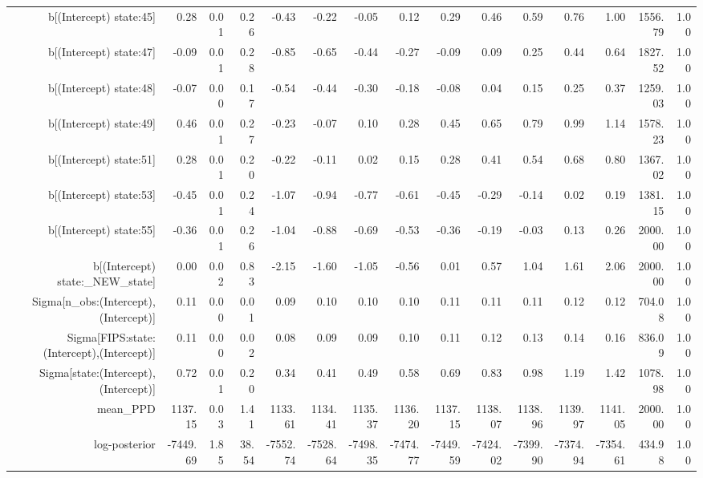 \begin{table}[ht]
\begin{tabular}{rrrrrrrrrrrrrrr}
  b[(Intercept) state:45] & 0.28 & 0.01 & 0.26 & -0.43 & -0.22 & -0.05 & 0.12 & 0.29 & 0.46 & 0.59 & 0.76 & 1.00 & 1556.79 & 1.00 \\ 
  b[(Intercept) state:47] & -0.09 & 0.01 & 0.28 & -0.85 & -0.65 & -0.44 & -0.27 & -0.09 & 0.09 & 0.25 & 0.44 & 0.64 & 1827.52 & 1.00 \\ 
  b[(Intercept) state:48] & -0.07 & 0.00 & 0.17 & -0.54 & -0.44 & -0.30 & -0.18 & -0.08 & 0.04 & 0.15 & 0.25 & 0.37 & 1259.03 & 1.00 \\ 
  b[(Intercept) state:49] & 0.46 & 0.01 & 0.27 & -0.23 & -0.07 & 0.10 & 0.28 & 0.45 & 0.65 & 0.79 & 0.99 & 1.14 & 1578.23 & 1.00 \\ 
  b[(Intercept) state:51] & 0.28 & 0.01 & 0.20 & -0.22 & -0.11 & 0.02 & 0.15 & 0.28 & 0.41 & 0.54 & 0.68 & 0.80 & 1367.02 & 1.00 \\ 
  b[(Intercept) state:53] & -0.45 & 0.01 & 0.24 & -1.07 & -0.94 & -0.77 & -0.61 & -0.45 & -0.29 & -0.14 & 0.02 & 0.19 & 1381.15 & 1.00 \\ 
  b[(Intercept) state:55] & -0.36 & 0.01 & 0.26 & -1.04 & -0.88 & -0.69 & -0.53 & -0.36 & -0.19 & -0.03 & 0.13 & 0.26 & 2000.00 & 1.00 \\ 
  b[(Intercept) state:\_NEW\_state] & 0.00 & 0.02 & 0.83 & -2.15 & -1.60 & -1.05 & -0.56 & 0.01 & 0.57 & 1.04 & 1.61 & 2.06 & 2000.00 & 1.00 \\ 
  Sigma[n\_obs:(Intercept),(Intercept)] & 0.11 & 0.00 & 0.01 & 0.09 & 0.10 & 0.10 & 0.10 & 0.11 & 0.11 & 0.11 & 0.12 & 0.12 & 704.08 & 1.00 \\ 
  Sigma[FIPS:state:(Intercept),(Intercept)] & 0.11 & 0.00 & 0.02 & 0.08 & 0.09 & 0.09 & 0.10 & 0.11 & 0.12 & 0.13 & 0.14 & 0.16 & 836.09 & 1.00 \\ 
  Sigma[state:(Intercept),(Intercept)] & 0.72 & 0.01 & 0.20 & 0.34 & 0.41 & 0.49 & 0.58 & 0.69 & 0.83 & 0.98 & 1.19 & 1.42 & 1078.98 & 1.00 \\ 
  mean\_PPD & 1137.15 & 0.03 & 1.41 & 1133.61 & 1134.41 & 1135.37 & 1136.20 & 1137.15 & 1138.07 & 1138.96 & 1139.97 & 1141.05 & 2000.00 & 1.00 \\ 
  log-posterior & -7449.69 & 1.85 & 38.54 & -7552.74 & -7528.64 & -7498.35 & -7474.77 & -7449.59 & -7424.02 & -7399.90 & -7374.94 & -7354.61 & 434.98 & 1.00 \\ 
   \hline
\end{tabular}
\end{table}
